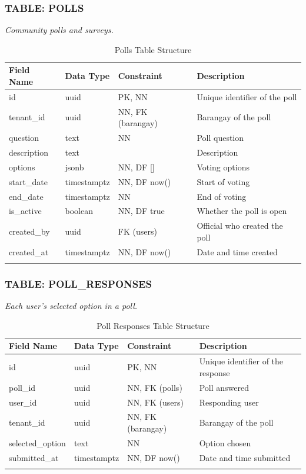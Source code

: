 \subsubsection*{TABLE: POLLS}
\noindent\textit{Community polls and surveys.}
\begin{longtable}{|p{3.2cm}|p{2.2cm}|p{3.2cm}|p{5.4cm}|}
\hline
\textbf{Field Name} & \textbf{Data Type} & \textbf{Constraint} & \textbf{Description} \\ \hline
\endhead
\hline \endfoot
\hline \endlastfoot
id & uuid & PK, NN & Unique identifier of the poll \\ \hline
tenant\_id & uuid & NN, FK (barangay) & Barangay of the poll \\ \hline
question & text & NN & Poll question \\ \hline
description & text & & Description \\ \hline
options & jsonb & NN, DF [] & Voting options \\ \hline
start\_date & timestamptz & NN, DF now() & Start of voting \\ \hline
end\_date & timestamptz & NN & End of voting \\ \hline
is\_active & boolean & NN, DF true & Whether the poll is open \\ \hline
created\_by & uuid & FK (users) & Official who created the poll \\ \hline
created\_at & timestamptz & NN, DF now() & Date and time created \\ \hline
\caption{Polls Table Structure}
\label{tab:polls}
\end{longtable}
\vspace{3mm}

\subsubsection*{TABLE: POLL\_RESPONSES}
\noindent\textit{Each user's selected option in a poll.}
\begin{longtable}{|p{3.2cm}|p{2.2cm}|p{3.2cm}|p{5.4cm}|}
\hline
\textbf{Field Name} & \textbf{Data Type} & \textbf{Constraint} & \textbf{Description} \\ \hline
\endhead
\hline \endfoot
\hline \endlastfoot
id & uuid & PK, NN & Unique identifier of the response \\ \hline
poll\_id & uuid & NN, FK (polls) & Poll answered \\ \hline
user\_id & uuid & NN, FK (users) & Responding user \\ \hline
tenant\_id & uuid & NN, FK (barangay) & Barangay of the poll \\ \hline
selected\_option & text & NN & Option chosen \\ \hline
submitted\_at & timestamptz & NN, DF now() & Date and time submitted \\ \hline
\caption{Poll Responses Table Structure}
\label{tab:poll_responses}
\end{longtable}
\vspace{3mm}


